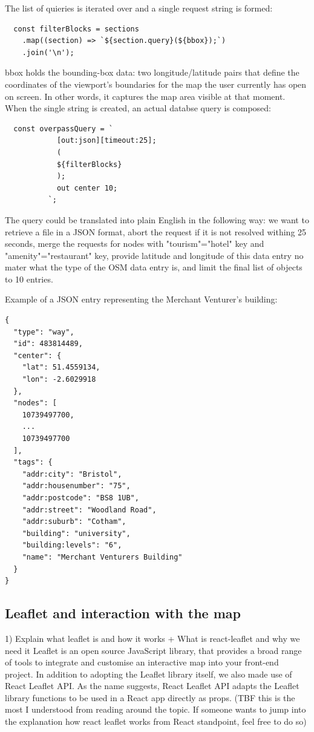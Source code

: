 The list of quieries is iterated over and a single request string is formed:
\begin{verbatim} 
  const filterBlocks = sections
    .map((section) => `${section.query}(${bbox});`)
    .join('\n');
\end{verbatim}
bbox holds the bounding-box data: two longitude/latitude pairs that define the coordinates of the viewport’s boundaries for the map the user currently has open on screen. In other words, it captures the map area visible at that moment. When the single string is created, an actual databse query is composed: 
\begin{verbatim} 
  const overpassQuery = `
            [out:json][timeout:25];
            (
            ${filterBlocks}
            );
            out center 10;
          `;
\end{verbatim}
The query could be translated into plain English in the following way: we want to retrieve a file in a JSON format, abort the request if it is not resolved withing 25 seconds, merge the requests for nodes with "tourism"="hotel" key and "amenity"="restaurant" key, provide latitude and longitude of this data entry no mater what the type of the OSM data entry is, and limit the final list of objects to 10 entries. 

Example of a JSON entry representing the Merchant Venturer's building:
\begin{verbatim} 
{
  "type": "way",
  "id": 483814489,
  "center": {
    "lat": 51.4559134,
    "lon": -2.6029918
  },
  "nodes": [
    10739497700,
    ...
    10739497700
  ],
  "tags": {
    "addr:city": "Bristol",
    "addr:housenumber": "75",
    "addr:postcode": "BS8 1UB",
    "addr:street": "Woodland Road",
    "addr:suburb": "Cotham",
    "building": "university",
    "building:levels": "6",
    "name": "Merchant Venturers Building"
  }
}
\end{verbatim}

\subsection{Leaflet and interaction with the map}
1) Explain what leaflet is and how it works +  What is react-leaflet and why we need it
Leaflet is an open source JavaScript library, that provides a broad range of tools to integrate and customise an interactive map into your front-end project. In addition to adopting the Leaflet library itself, we also made use of React Leaflet API. As the name suggests, React Leaflet API adapts the Leaflet library functions to be used in a React app directly as props. (TBF this is the most I understood from reading around the topic. If someone wants to jump into the explanation how react leaflet works from React standpoint, feel free to do so)

